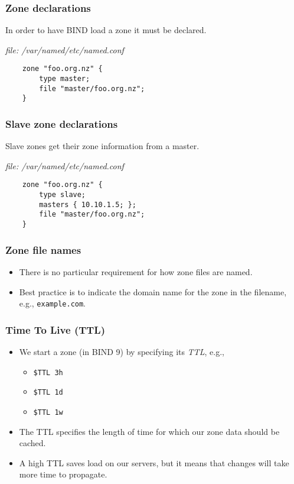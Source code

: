 \documentclass[10pt]{beamer}
\begin{document}
\begin{frame}[fragile]
	\frametitle{Zone declarations}
	In order to have BIND load a zone it must be declared.
	
	\emph{file: /var/named/etc/named.conf}
	\begin{verbatim}
	zone "foo.org.nz" {
	    type master;
	    file "master/foo.org.nz";
	}
	\end{verbatim}
	
\end{frame}
\begin{frame}[fragile]
	\frametitle{Slave zone declarations}
	Slave zones get their zone information from a master.
	
	\emph{file: /var/named/etc/named.conf}
	\begin{verbatim}
	zone "foo.org.nz" {
	    type slave;
	    masters { 10.10.1.5; };
	    file "master/foo.org.nz";
	}
	\end{verbatim}
	
\end{frame}
\begin{frame}
  \frametitle{Zone file names}

 \begin{itemize}
  \item There is no particular requirement for how zone files are named.
  \item Best practice is to indicate the domain name for the zone in the filename, e.g., \texttt{example.com}.
 \end{itemize}

\end{frame}


\begin{frame}
  \frametitle{Time To Live (TTL)}

 \begin{itemize}
  \item We start a zone (in BIND 9) by specifying its \emph{TTL}, e.g.,
      \begin{itemize}
        \item \texttt{\$TTL 3h}
        \item \texttt{\$TTL 1d}
        \item \texttt{\$TTL 1w}
      \end{itemize}
  \item The TTL specifies the length of time for which our zone data should be cached.
  \item A high TTL saves load on our servers, but it means that changes will take more time to propagate.
 \end{itemize}
\end{frame}
\end{document}
